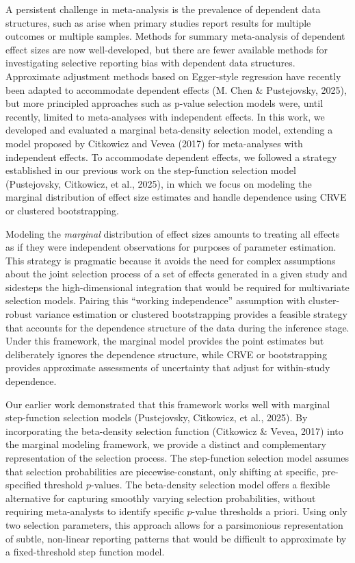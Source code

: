 \documentclass[
  american,
  man, donotrepeattitle,floatsintext]{apa7}
\begin{document}
A persistent challenge in meta-analysis is the prevalence of dependent data structures, such as arise when primary studies report results for multiple outcomes or multiple samples.
Methods for summary meta-analysis of dependent effect sizes are now well-developed, but there are fewer available methods for investigating selective reporting bias with dependent data structures.
Approximate adjustment methods based on Egger-style regression have recently been adapted to accommodate dependent effects (M. Chen \& Pustejovsky, 2025), but more principled approaches such as p-value selection models were, until recently, limited to meta-analyses with independent effects.
In this work, we developed and evaluated a marginal beta-density selection model, extending a model proposed by Citkowicz and Vevea (2017) for meta-analyses with independent effects. To accommodate dependent effects, we followed a strategy established in our previous work on the step-function selection model (Pustejovsky, Citkowicz, et al., 2025), in which we focus on modeling the marginal distribution of effect size estimates and handle dependence using CRVE or clustered bootstrapping.

Modeling the \emph{marginal} distribution of effect sizes amounts to treating all effects as if they were independent observations for purposes of parameter estimation. This strategy is pragmatic because it avoids the need for complex assumptions about the joint selection process of a set of effects generated in a given study and sidesteps the high-dimensional integration that would be required for multivariate selection models. Pairing this ``working independence'' assumption with cluster-robust variance estimation or clustered bootstrapping provides a feasible strategy that accounts for the dependence structure of the data during the inference stage. Under this framework, the marginal model provides the point estimates but deliberately ignores the dependence structure, while CRVE or bootstrapping provides approximate assessments of uncertainty that adjust for within-study dependence.

Our earlier work demonstrated that this framework works well with marginal step-function selection models (Pustejovsky, Citkowicz, et al., 2025).
By incorporating the beta-density selection function (Citkowicz \& Vevea, 2017) into the marginal modeling framework, we provide a distinct and complementary representation of the selection process.
The step-function selection model assumes that selection probabilities are piecewise-constant, only shifting at specific, pre-specified threshold \(p\)-values.
The beta-density selection model offers a flexible alternative for capturing smoothly varying selection probabilities, without requiring meta-analysts to identify specific \(p\)-value thresholds a priori.
Using only two selection parameters, this approach allows for a parsimonious representation of subtle, non-linear reporting patterns that would be difficult to approximate by a fixed-threshold step function model.
\end{document}
